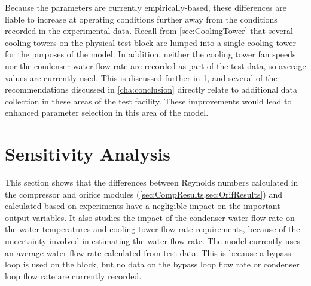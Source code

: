 Because the parameters are currently empirically-based,
these differences are liable to increase at operating conditions
further away from the conditions recorded in the experimental data.
Recall from \cref{sec:CoolingTower} that several cooling towers on
the physical test block are lumped into a single cooling tower for
the purposes of the model.
In addition, neither the cooling tower fan speeds nor the condenser
water flow rate are recorded as part of the test data, so average
values are currently used.
This is discussed further in \cref{sec:sensitivity}, and
several of the recommendations discussed in \cref{cha:conclusion}
directly relate to additional data collection in these areas of the test
facility.
These improvements would lead to enhanced parameter selection
in this area of the model.

\section{Sensitivity Analysis} \label{sec:sensitivity}
This section shows that the differences between
Reynolds numbers calculated in the compressor and orifice modules 
(\cref{sec:CompResults,sec:OrifResults}) and calculated based on
experiments have a negligible
impact on the important output variables.
It also studies the impact of the condenser water flow rate on the
water temperatures and cooling tower flow rate requirements,
because of the uncertainty involved in estimating the water flow rate.
The model currently uses an average water flow rate calculated
from test data.
This is because a bypass loop is used on the block, but no data
on the bypass loop flow rate or condenser loop flow rate are currently recorded.

